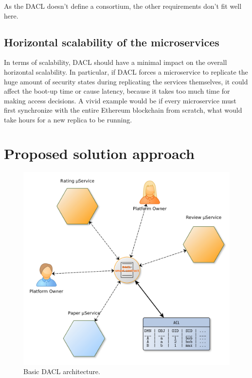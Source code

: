 \documentclass[12pt, conference]{IEEEtran}
\begin{document}
As the DACL doesn't define a consortium, the other requirements don't fit well here.




\subsection{Horizontal scalability of the microservices}
In terms of scalability, DACL should have a minimal impact on the overall horizontal scalability. In particular, if DACL forces a microservice to replicate the huge amount of security states during replicating the services themselves, it could affect the boot-up time or cause latency, because it takes too much time for making access decisions. A vivid example would be if every microservice must first synchronize with the entire Ethereum blockchain from scratch, what would take hours for a new replica to be running.

\section{Proposed solution approach}


\begin{figure}[!h]
    \centering
  \includegraphics[width=\linewidth]{figures/DACL-basic.png}
  \caption{Basic DACL architecture.}
  \label{fig:basic-dacl}
\end{figure}
\end{document}
